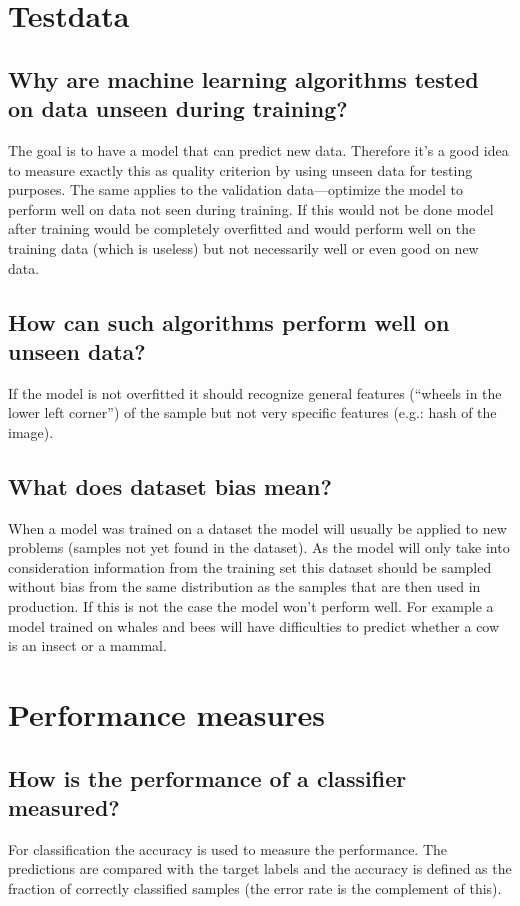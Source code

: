 \section{Testdata}
\subsection{Why are machine learning algorithms tested on data unseen during training?}
The goal is to have a model that can predict new data. Therefore it's a good idea to measure exactly this as quality criterion by using unseen data for testing purposes. The same applies to the validation data---optimize the model to perform well on data not seen during training. If this would not be done model after training would be completely overfitted and would perform well on the training data (which is useless) but not necessarily well or even good on new data.
\subsection{How can such algorithms perform well on unseen data?}
If the model is not overfitted it should recognize general features (``wheels in the lower left corner'') of the sample but not very specific features (e.g.: hash of the image). 
\subsection{What does dataset bias mean? }
When a model was trained on a dataset the model will usually be applied to new problems (samples not yet found in the dataset). As the model will only take into consideration information from the training set this dataset should be sampled without bias from the same distribution as the samples that are then used in production. If this is not the case the model won't perform well. For example a model trained on whales and bees will have difficulties to predict whether a cow is an insect or a mammal.
%
\section{Performance measures}
\subsection{How is the performance of a classifier measured?}
For classification the accuracy is used to measure the performance. The predictions are compared with the target labels and the accuracy is defined as the fraction of correctly classified samples (the error rate is the complement of this).
